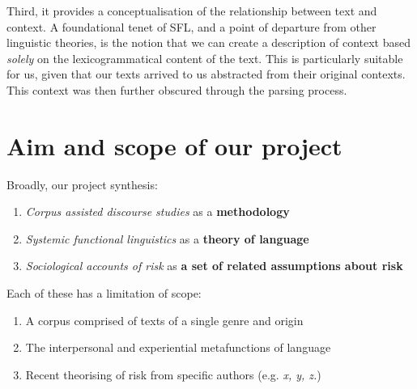      Third, it provides a conceptualisation of the relationship between text and context. A foundational tenet of SFL, and a point of departure from other linguistic theories, is the notion that we can create a description of context based \emph{solely} on the lexicogrammatical content of the text. This is particularly suitable for us, given that our texts arrived to us abstracted from their original contexts. This context was then further obscured through the parsing process.

    



\section{Aim and scope of our project}

Broadly, our project synthesis:

\begin{enumerate}
    \item \emph{Corpus assisted discourse studies} as a \textbf{methodology}
    \item \emph{Systemic functional linguistics} as a \textbf{theory of language}
    \item \emph{Sociological accounts of risk} as \textbf{a set of related assumptions about risk}
\end{enumerate}

Each of these has a limitation of scope:

\begin{enumerate}
    \item A corpus comprised of texts of a single genre and origin
    \item The interpersonal and experiential metafunctions of language
    \item Recent theorising of risk from specific authors (e.g. \emph{x, y, z.})
\end{enumerate}

%